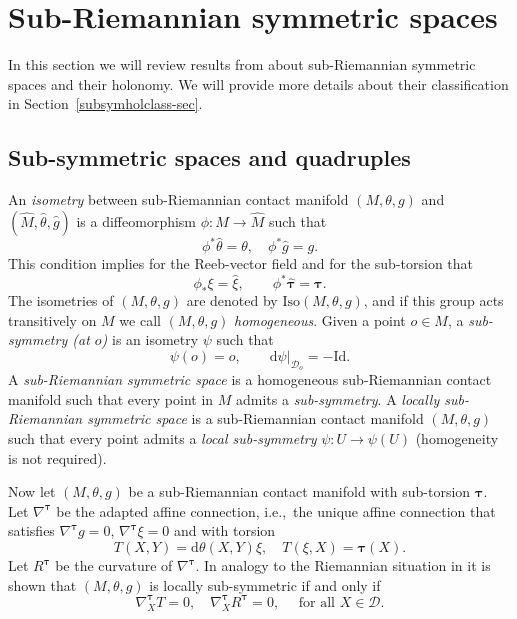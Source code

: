 \documentclass{amsart}
\theoremstyle{plain}
\theoremstyle{definition}
\newcommand{\bt}{{\boldsymbol{\tau}}}
\newcommand{\1}{\mathbf{1}}
\newcommand{\Iso}{\mathrm{Iso}}
\newcommand{\D}{{\mathcal D}}
\renewcommand{\d}{\mathrm{d}}
\newcommand{\+}{\oplus}
\begin{document}
\section{Sub-Riemannian symmetric spaces}\label{secpsHermHolClass}
In this section we will review  results from 
\cite{BFG,FG,FGR} about sub-Riemannian symmetric spaces and their holonomy. We will provide more details about their classification in  Section~\ref{subsymholclass-sec}.
\subsection{Sub-symmetric spaces and quadruples}
\label{subsym-sec1}
An {\em isometry} between  sub-Riemannian contact manifold $(M,\theta,g)$ and $(\hat M,\hat \theta,\hat g)$  is a diffeomorphism $\phi:M\to \hat M$ such that 
\[\phi^*\hat \theta= \theta,\quad \phi^*\hat g=g.\]
This condition implies for the Reeb-vector field and for the sub-torsion that  
\[\phi_*\xi=\hat\xi, \qquad  \phi^*\hat \bt=\bt.\]
The isometries of $(M,\theta,g)$ are denoted by $\Iso (M,\theta,g)$, and if this group acts transitively on $M$ we call $(M,\theta,g)$ {\em homogeneous}. Given a point $o\in M$, a {\em sub-symmetry (at $o$)} is an isometry $\psi$ such that 
\[\psi(o)=o,\qquad\d\psi|_{\D_o}=-\mathrm{Id}.\]
A {\em sub-Riemannian symmetric space} is a homogeneous  sub-Riemannian contact manifold such that   every point in $M$ admits a  {\em sub-symmetry}.  A {\em locally sub-Riemannian symmetric space} is a  sub-Riemannian contact manifold $(M,\theta,g)$ such that every point admits a {\em local sub-symmetry} $\psi:U\to \psi(U)$ (homogeneity is not required). 

Now let $(M,\theta,g)$ be a sub-Riemannian contact manifold with sub-torsion $\bt$. Let $\nabla^\bt$ be the adapted affine connection, i.e.,~the unique affine connection that satisfies $\nabla^\bt g=0$,  $\nabla^\bt\xi=0$ and with torsion 
\[T(X,Y)= \d\theta(X,Y)\xi,\quad T(\xi,X)=\bt(X).\]
Let $R^\bt$ be the curvature of $\nabla^\bt$.
In analogy to the Riemannian situation in \cite[Theorem~2.1]{FG} it is shown that $(M,\theta,g)$ is locally sub-symmetric if and only if
\[\nabla^\bt_X T=0,\quad \nabla^\bt_X R^\bt=0,\quad\text{ for all $X\in \D$.}\]
\end{document}
